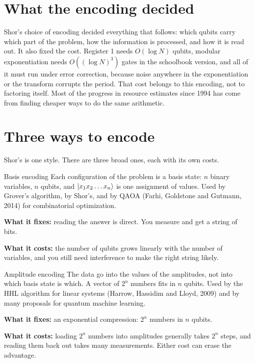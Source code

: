 \section{What the encoding decided}

Shor's choice of encoding decided everything that follows: which qubits carry which
part of the problem, how the information is processed, and how it is read out. It
also fixed the cost. Register 1 needs $O(\log N)$ qubits, modular exponentiation
needs $O((\log N)^3)$ gates in the schoolbook version, and all of it must run under
error correction, because noise anywhere in the exponentiation or the transform
corrupts the period. That cost belongs to this encoding, not to factoring itself.
Most of the progress in resource estimates since 1994 has come from finding cheaper
ways to do the same arithmetic.

\section{Three ways to encode}

Shor's is one style. There are three broad ones, each with its own costs.

\begin{concept}{Basis encoding}
Each configuration of the problem is a basis state: $n$ binary variables, $n$
qubits, and $\ket{x_1x_2\dots x_n}$ is one assignment of values. Used by Grover's
algorithm, by Shor's, and by QAOA (Farhi, Goldstone and Gutmann, 2014) for
combinatorial optimization.

\textbf{What it fixes:} reading the answer is direct. You measure and get a string
of bits.

\textbf{What it costs:} the number of qubits grows linearly with the number of
variables, and you still need interference to make the right string likely.
\end{concept}

\begin{concept}{Amplitude encoding}
The data go into the values of the amplitudes, not into which basis state is which.
A vector of $2^n$ numbers fits in $n$ qubits. Used by the HHL algorithm for linear
systems (Harrow, Hassidim and Lloyd, 2009) and by many proposals for quantum
machine learning.

\textbf{What it fixes:} an exponential compression: $2^n$ numbers in $n$ qubits.

\textbf{What it costs:} loading $2^n$ numbers into amplitudes generally takes
$2^n$ steps, and reading them back out takes many measurements. Either cost can
erase the advantage.
\end{concept}

